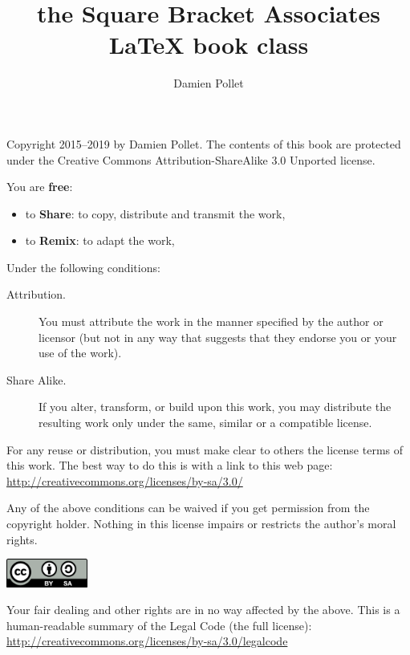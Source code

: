 \documentclass[twoside,openany,showtrims]{sbabook}
\title{the Square Bracket Associates\titlebreak{}
  \texorpdfstring{\protect\LaTeX}{LaTeX} book class}
\author{Damien Pollet}
\date{\gitdate\titlebreak[\smallskip]{ -- }\protect\gitCommitInfo}
\begin{document}
\maketitle
\pagestyle{titlingpage}
\thispagestyle{titlingpage} %

\cleartoverso
{\small

  Copyright 2015--2019 by Damien Pollet.
  The contents of this book are protected under the Creative Commons
  Attribution-ShareAlike 3.0 Unported license.

  You are \textbf{free}:
  \begin{itemize}
  \item to \textbf{Share}: to copy, distribute and transmit the work,
  \item to \textbf{Remix}: to adapt the work,
  \end{itemize}

  Under the following conditions:
  \begin{description}
  \item[Attribution.] You must attribute the work in the manner specified by the
    author or licensor (but not in any way that suggests that they endorse you
    or your use of the work).
  \item[Share Alike.] If you alter, transform, or build upon this work, you may
    distribute the resulting work only under the same, similar or a compatible
    license.
  \end{description}

  For any reuse or distribution, you must make clear to others the
  license terms of this work. The best way to do this is with a link to
  this web page: \\
  \url{http://creativecommons.org/licenses/by-sa/3.0/}

  Any of the above conditions can be waived if you get permission from
  the copyright holder. Nothing in this license impairs or restricts the
  author's moral rights.

  \begin{center}
    \includegraphics[width=0.2\textwidth]{CreativeCommons-BY-SA.pdf}
  \end{center}

  Your fair dealing and other rights are in no way affected by the
  above. This is a human-readable summary of the Legal Code (the full
  license): \\
  \url{http://creativecommons.org/licenses/by-sa/3.0/legalcode}

}
\end{document}
